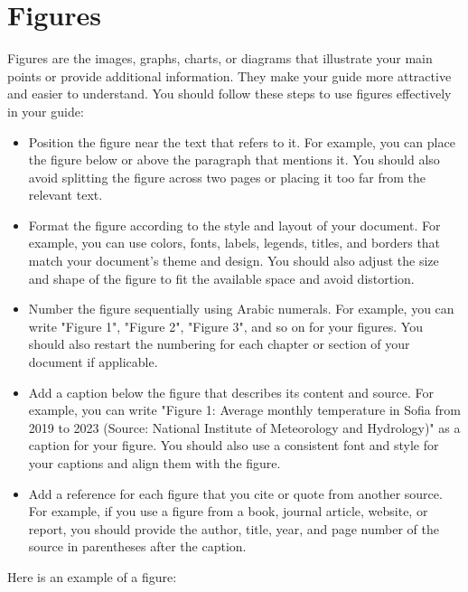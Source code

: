 \documentclass[12pt]{article}
\begin{document}
\pagebreak

\section{Figures}

Figures are the images, graphs, charts, or diagrams that illustrate your main points or provide additional information. They make your guide more attractive and easier to understand. You should follow these steps to use figures effectively in your guide:

\begin{itemize}
    \item Position the figure near the text that refers to it. For example, you can place the figure below or above the paragraph that mentions it. You should also avoid splitting the figure across two pages or placing it too far from the relevant text.
    \item Format the figure according to the style and layout of your document. For example, you can use colors, fonts, labels, legends, titles, and borders that match your document's theme and design. You should also adjust the size and shape of the figure to fit the available space and avoid distortion.
    \item Number the figure sequentially using Arabic numerals. For example, you can write "Figure 1", "Figure 2", "Figure 3", and so on for your figures. You should also restart the numbering for each chapter or section of your document if applicable.
    \item Add a caption below the figure that describes its content and source. For example, you can write "Figure 1: Average monthly temperature in Sofia from 2019 to 2023 (Source: National Institute of Meteorology and Hydrology)" as a caption for your figure. You should also use a consistent font and style for your captions and align them with the figure.
    \item Add a reference for each figure that you cite or quote from another source. For example, if you use a figure from a book, journal article, website, or report, you should provide the author, title, year, and page number of the source in parentheses after the caption.
\end{itemize}

Here is an example of a figure:

\pagebreak
\end{document}
